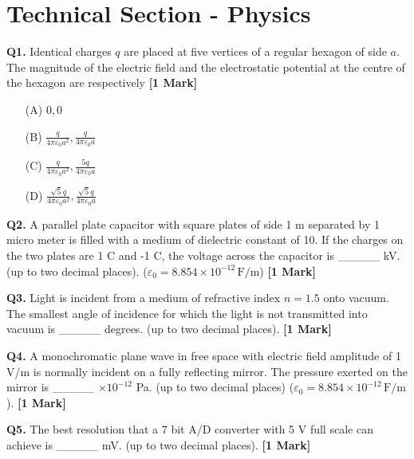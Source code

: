 \documentclass[11pt]{article}
\newcommand{\questiona}[2]{
    \noindent\textbf{Q#2.} #1 \hfill \textbf{[1 Mark]}
}
\begin{document}
\section*{Technical Section - Physics}

\questiona{Identical charges \( q \) are placed at five vertices of a regular hexagon of side \( a \). The magnitude of the electric field and the electrostatic potential at the centre of the hexagon are respectively}{1}
\begin{enumerate}
    \item[(A)] \( 0, 0 \)
    \item[(B)] \(\frac{q}{4\pi\varepsilon_0a^2}, \frac{q}{4\pi\varepsilon_0a}\)
    \item[(C)] \(\frac{q}{4\pi\varepsilon_0a^2}, \frac{5q}{4\pi\varepsilon_0a}\)
    \item[(D)] \(\frac{\sqrt{5}q}{4\pi\varepsilon_0a^2}, \frac{\sqrt{5}q}{4\pi\varepsilon_0a}\)
\end{enumerate}
\vspace{0.5cm}

\questiona{A parallel plate capacitor with square plates of side 1 m separated by 1 micro meter is filled with a medium of dielectric constant of 10. If the charges on the two plates are 1 C and -1 C, the voltage across the capacitor is \_\_\_\_\_ kV. (up to two decimal places). (\(\varepsilon_0 = 8.854 \times 10^{-12} \, \text{F/m}\))}{2}
\vspace{0.5cm}

\questiona{Light is incident from a medium of refractive index \( n = 1.5 \) onto vacuum. The smallest angle of incidence for which the light is not transmitted into vacuum is \_\_\_\_\_ degrees. (up to two decimal places).}{3}
\vspace{0.5cm}

\questiona{A monochromatic plane wave in free space with electric field amplitude of 1 V/m is normally incident on a fully reflecting mirror. The pressure exerted on the mirror is \_\_\_\_\_ \(\times 10^{-12}\) Pa. (up to two decimal places) (\(\varepsilon_0 = 8.854 \times 10^{-12} \, \text{F/m}\)).}{4}
\vspace{0.5cm}

\questiona{The best resolution that a 7 bit A/D converter with 5 V full scale can achieve is \_\_\_\_\_ mV. (up to two decimal places).}{5}
\vspace{0.5cm}
\end{document}
